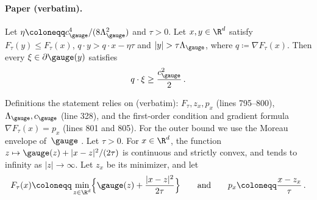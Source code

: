 \paragraph{Paper (verbatim).}
\begin{lemma}\label{lem:cap}
Let $\eta\coloneqq c_\gauge^4/(8\Lambda_\gauge^2)$ and $\tau>0$. Let $x,y\in\R^d$ satisfy $F_\tau(y)\leq F_\tau(x)$, $q\cdot y>q\cdot x-\eta\tau$ and $|y|>\tau\Lambda_\gauge$, where $q\coloneqq\nabla F_\tau(x)$. Then every $\xi\in\partial \gauge(y)$ satisfies
\begin{equation*}
q\cdot\xi\geq\frac{c_\gauge^2}2\, .
\end{equation*}
\end{lemma}
Definitions the statement relies on (verbatim): $F_\tau,z_x,p_x$ (lines 795--800), $\Lambda_\gauge,c_\gauge$ (line 328),
and the first-order condition and gradient formula $\nabla F_\tau(x)=p_x$ (lines 801 and 805).
For the outer bound we use the Moreau envelope of~$\gauge$ \citep{Moreau1965}. Let $\tau>0$. For $x\in\R^d$, the function $z\mapsto \gauge(z)+|x-z|^2/(2\tau)$ is continuous and strictly convex, and tends to infinity as $|z|\to\infty$. Let $z_x$ be its minimizer, and let
\begin{equation*}
F_\tau(x)\coloneqq\min_{z\in\R^d}\Bigl\{\gauge(z)+\frac{|x-z|^2}{2\tau}\Bigr\}
\qquad\text{and}\qquad
p_x\coloneqq\frac{x-z_x}\tau\, .
\end{equation*}
